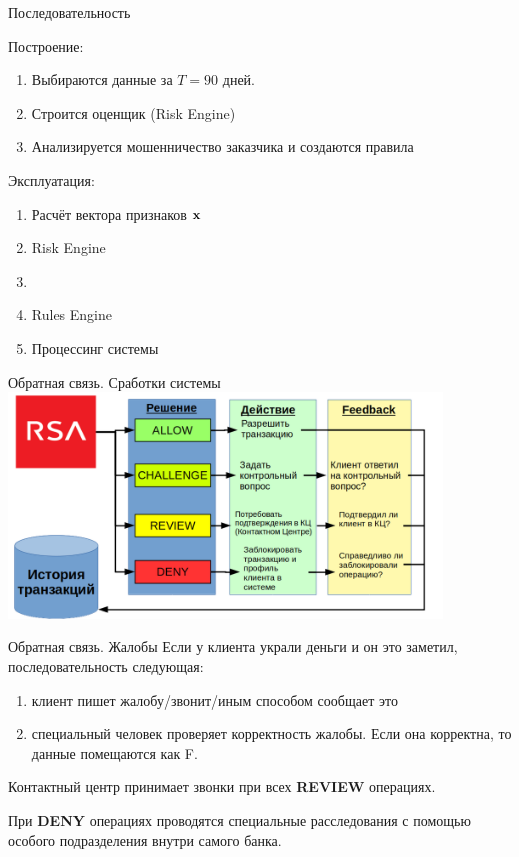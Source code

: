\begin{frame}{Последовательность}
	
	Построение:
	\begin{enumerate}
		\item Выбираются данные за $T=90$ дней.
		\item Строится оценщик (Risk Engine)
		\item Анализируется мошенничество заказчика и создаются правила
	\end{enumerate}

	Эксплуатация:
	\begin{enumerate}
		\item Расчёт вектора признаков $\bold x$
		\item Risk Engine
			\item 
		\item Rules Engine
		\item Процессинг системы
	\end{enumerate}

\end{frame}

\begin{frame}{Обратная связь. Сработки системы}\label{frame:rsa_feedback}
\includegraphics[width=11.5cm]{../pic/expert_system_rsa_feedback.png}
\end{frame}


\begin{frame}{Обратная связь. Жалобы}
	Если у клиента украли деньги и он это заметил, последовательность следующая:
	\begin{enumerate}
		\item клиент пишет жалобу/звонит/иным способом сообщает это
		\item специальный человек проверяет корректность жалобы. 
		Если она корректна, то данные помещаются как F.
	\end{enumerate}
	
	Контактный центр принимает звонки при всех \textbf{REVIEW} операциях.
	
	При \textbf{DENY} операциях проводятся специальные расследования с помощью 
	особого подразделения внутри самого банка.
\end{frame}

